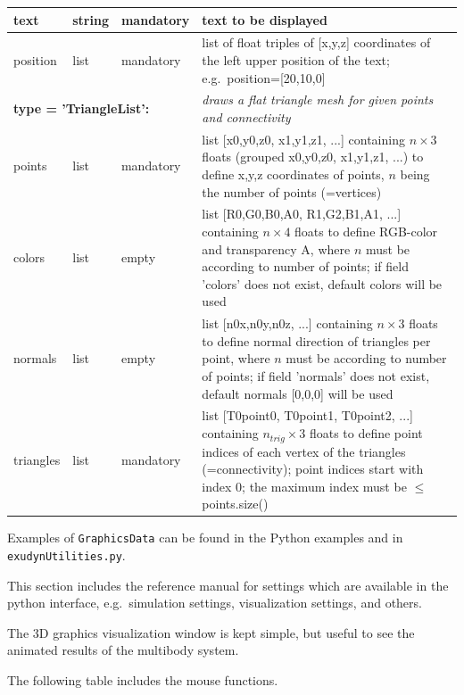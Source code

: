 \documentclass[11pt,a4paper]{book} %
\begin{document}
\begin{center}
\begin{longtable}{| p{3cm} | p{2cm} | p{3cm} | p{7.5cm} |}
  text & string & mandatory & text to be displayed\\ \hline
  position & list & mandatory & list of float triples of [x,y,z] coordinates of the left upper position of the text; e.g.\ position=[20,10,0] \\ \hline
	\multicolumn{3}{l}{\parbox{8cm}{\bf type = 'TriangleList': }} & \multicolumn{1}{l}{\parbox{7.5cm}{\it draws a flat triangle mesh for given points and connectivity}}\\ \hline
  points & list & mandatory & list [x0,y0,z0, x1,y1,z1, ...] containing $n \times 3$ floats (grouped x0,y0,z0, x1,y1,z1, ...) to define x,y,z coordinates of points, $n$ being the number of points (=vertices)\\ \hline
  colors & list & empty & list [R0,G0,B0,A0, R1,G2,B1,A1, ...] containing $n \times 4$ floats to define RGB-color and transparency A, where $n$ must be according to number of points; if field 'colors' does not exist, default colors will be used\\ \hline
  normals & list & empty & list [n0x,n0y,n0z, ...] containing $n \times 3$ floats to define normal direction of triangles per point, where $n$ must be according to number of points; if field 'normals' does not exist, default normals [0,0,0] will be used\\ \hline
  triangles & list &  mandatory & list [T0point0, T0point1, T0point2, ...] containing $n_{trig} \times 3$ floats to define point indices of each vertex of the triangles (=connectivity); point indices start with index 0; the maximum index must be $\le$ points.size()\\ \hline
\end{longtable}
%
Examples of \texttt{GraphicsData} can be found in the Python examples and in \texttt{exudynUtilities.py}.
%
\end{center}


This section includes the reference manual for settings which are available in the python interface, e.g.\ simulation settings, visualization settings, and others.




The 3D graphics visualization window is kept simple, but useful to see the animated results of the multibody system.

The following table includes the mouse functions. 
\end{document}
